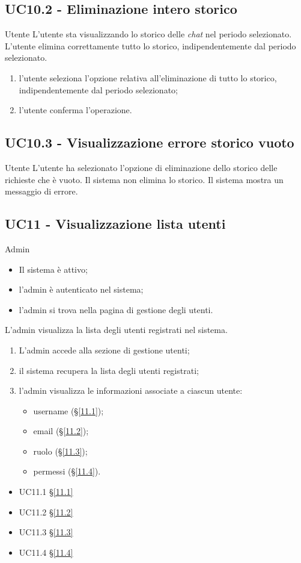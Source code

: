 \subsection{UC10.2 - Eliminazione intero storico}
\label{10.2}
\makeUC{}
{Utente}
{L'utente sta visualizzando lo storico delle \textit{chat} nel periodo selezionato.}
{L'utente elimina correttamente tutto lo storico, indipendentemente dal periodo selezionato.}
{
    \begin{enumerate}
        \item l'utente seleziona l'opzione relativa all'eliminazione di tutto lo storico, indipendentemente dal periodo selezionato;
        \item l'utente conferma l'operazione.
    \end{enumerate}
}{}{}{}{}

\subsection{UC10.3 - Visualizzazione errore storico vuoto}
\label{10.3}
\makeUC{}
{Utente}
{L'utente ha selezionato l'opzione di eliminazione dello storico delle richieste che è vuoto.}
{Il sistema non elimina lo storico.}
{Il sistema mostra un messaggio di errore.}{}{}{}{}

\subsection{UC11 - Visualizzazione lista utenti}
\label{11}
{Admin}
{
    \begin{itemize}
        \item Il sistema è attivo;
        \item l'admin è autenticato nel sistema;
        \item l'admin si trova nella pagina di gestione degli utenti.
    \end{itemize}
}
{L'admin visualizza la lista degli utenti registrati nel sistema.}
{
    \begin{enumerate}
        \item L'admin accede alla sezione di gestione utenti;
        \item il sistema recupera la lista degli utenti registrati;
        \item l'admin visualizza le informazioni associate a ciascun utente:
        \begin{itemize}
            \item username (§\ref{11.1});
            \item email (§\ref{11.2});
            \item ruolo (§\ref{11.3});
            \item permessi (§\ref{11.4}).
        \end{itemize}
    \end{enumerate}
}
{
    \begin{itemize}
        \item UC11.1 §\ref{11.1}
        \item UC11.2 §\ref{11.2}
        \item UC11.3 §\ref{11.3}
        \item UC11.4 §\ref{11.4}
    \end{itemize}
}
{}{}{}
